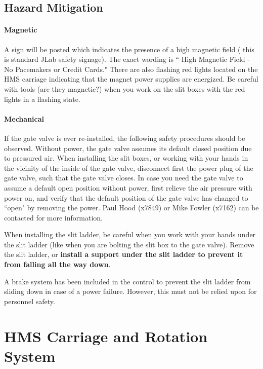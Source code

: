 {\subsection{Hazard Mitigation}

\paragraph{Magnetic}

A sign will be posted which indicates the presence of a high magnetic
field ( this is standard JLab safety signage). The exact wording is
`` High Magnetic Field - No Pacemakers or Credit Cards." There are also
flashing red lights located on the HMS carriage indicating that the
magnet power supplies are energized. Be careful with tools (are they magnetic?)
when you work on the slit boxes with the red lights in a flashing state.

\paragraph{Mechanical}

If the gate valve is ever re-installed, the following safety
procedures should be observed.  Without power, the gate valve assumes its default closed position due to
pressured air. When installing the slit boxes, or working with your hands
in the vicinity of the inside of the gate valve, disconnect first the power
plug of the gate valve, such that the gate valve closes.
In case you need the gate valve to assume a default open position without
power, first relieve the air pressure
with power on, and verify that the default position of the gate valve has
changed to ``open" by removing the power. Paul Hood (x7849) or Mike Fowler
(x7162) can be contacted for more information.

When installing the slit ladder, be careful when you work with your hands
under the slit ladder (like when you are bolting the slit box to the
gate valve). Remove the slit ladder, or {\bf install a support under the slit
ladder to prevent it from falling all the way down}.

A brake system has been included in the control to prevent the slit ladder
from sliding down in case of a power failure.  However, this must not
be relied upon for personnel safety.


\section{HMS Carriage and Rotation System }

}
